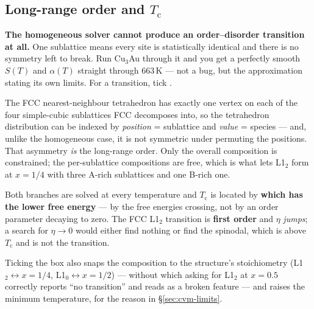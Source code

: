 \subsection{Long-range order and $T_\mathrm{c}$}

\begin{calwarn}
\textbf{The homogeneous solver cannot produce an order--disorder transition at
all.} One sublattice means every site is statistically identical and there is no
symmetry left to break. Run Cu$_3$Au through it and you get a perfectly smooth
$S(T)$ and $\alpha(T)$ straight through 663\,K --- not a bug, but the
approximation stating its own limits. For a transition, tick .
\end{calwarn}

The FCC nearest-neighbour tetrahedron has exactly one vertex on each of the four
simple-cubic sublattices FCC decomposes into, so the tetrahedron distribution
can be indexed by \emph{position} = sublattice and \emph{value} = species ---
and, unlike the homogeneous case, it is not symmetric under permuting the
positions. That asymmetry \emph{is} the long-range order. Only the overall
composition is constrained; the per-sublattice compositions are free, which is
what lets L1$_2$ form at $x = 1/4$ with three A-rich sublattices and one B-rich
one.

Both branches are solved at every temperature and $T_\mathrm{c}$ is located by
\textbf{which has the lower free energy} --- by the free energies crossing, not
by an order parameter decaying to zero. The FCC L1$_2$ transition is
\textbf{first order} and $\eta$ \emph{jumps}; a search for $\eta \to 0$ would
either find nothing or find the spinodal, which is above $T_\mathrm{c}$ and is
not the transition.

Ticking the box also snaps the composition to the structure's stoichiometry
(L1$_2 \leftrightarrow x = 1/4$, L1$_0 \leftrightarrow x = 1/2$) --- without
which asking for L1$_2$ at $x = 0.5$ correctly reports ``no transition'' and
reads as a broken feature --- and raises the minimum temperature, for the reason
in \S\ref{sec:cvm-limits}.

